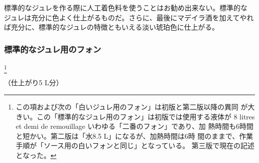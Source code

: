 標準的なジュレを作る際に人工着色料を使うことはお勧め出来ない。標準的な
ジュレは充分に色よく仕上がるものだ。さらに、最後にマデイラ酒を加えてやれ
ば充分に、標準的なジュレの特徴ともいえる淡い琥珀色に仕上がる。
\begin{recette}
\hypertarget{fonds-pour-gelee-ordinaire}{%
\subsubsection{標準的なジュレ用のフォン}\label{fonds-pour-gelee-ordinaire}}

\footnote{この項および次の「白いジュレ用のフォン」は初版と第二版以降の異同
  が大きい。この「標準的なジュレ用のフォン」は初版では使用する液体が 8
  litres et demi de remouillage いわゆる「二番のフォン」であり、加
  熱時間も6時間と短かい。第二版は「水8.5 L」になるが、加熱時間は6時
  間のままで、作業手順が「ソース用の白いフォンと同じ」となっている。
  第三版で現在の記述となった。}


（仕上がり5 L分）


\end{recette}
